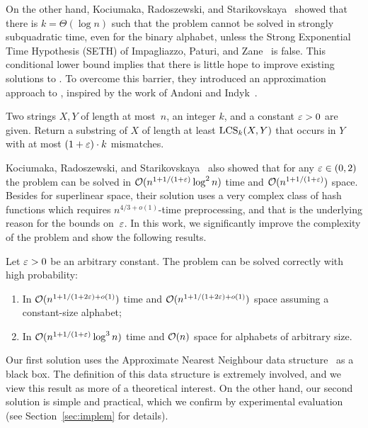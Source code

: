On the other hand, Kociumaka, Radoszewski, and Starikovskaya~\cite{DBLP:journals/algorithmica/KociumakaRS19} showed that there is $k = \Theta(\log n)$ such that the \kLCS problem cannot be solved in strongly subquadratic time, even for the binary alphabet, unless the Strong Exponential Time Hypothesis (SETH) of Impagliazzo, Paturi, and Zane~\cite{DBLP:journals/jcss/ImpagliazzoPZ01} is false. This conditional lower bound implies that there is little hope to improve existing solutions to \kLCS. To overcome this barrier, they introduced an approximation approach to \kLCS, inspired by the work of Andoni and Indyk~\cite{substringNN}. 

\begin{problem}[\kApproxLCS]\label{pr:LCS'k}
Two strings $X, Y$ of length at most~$n$, an integer $k$, and a constant $\varepsilon > 0$ are given. Return a substring of $X$ of length at least $\mathrm{LCS}_{k}(X,Y)$ that occurs in $Y$ with at most $(1+\varepsilon) \cdot k$ mismatches.
\end{problem}

Kociumaka, Radoszewski, and Starikovskaya~\cite{DBLP:journals/algorithmica/KociumakaRS19} also showed that for any $\varepsilon \in (0,2)$ the \kApproxLCS problem can be solved in $\mathcal{O} (n^{1+1/(1+\varepsilon)} \log^2 n)$ time and $\mathcal{O} (n^{1+1/(1+\varepsilon)})$ space. Besides for superlinear space, their solution uses a very complex class of hash functions which requires $n^{4/3+o(1)}$-time preprocessing, and that is the underlying reason for the bounds on~$\varepsilon$. In this work, we significantly improve the complexity of the \kApproxLCS problem and show the following results.

\begin{theorem}\label{th:klcs_upper}
Let $\varepsilon > 0$ be an arbitrary constant. The \kApproxLCS problem can be solved correctly with high probability:
\begin{enumerate}[label=\arabic*)]
\item In $\mathcal{O}(n^{1+ 1/(1+2\varepsilon) + o(1)})$ time and $\mathcal{O}(n^{1+ 1/(1+2\varepsilon) + o(1)})$ space assuming a constant-size alphabet;
\item In $\mathcal{O}(n^{1+1/(1+\varepsilon)} \log^3 n)$ time and $\mathcal{O}(n)$ space for alphabets of arbitrary size. 
\end{enumerate}
\end{theorem}

Our first solution uses the Approximate Nearest Neighbour data structure~\cite{DBLP:conf/stoc/AndoniR15} as a black box. The definition of this data structure is extremely involved, and we view this result as more of a theoretical interest.
On the other hand, our second solution is simple and practical, which we confirm by experimental evaluation (see Section~\ref{sec:implem} for details). 

